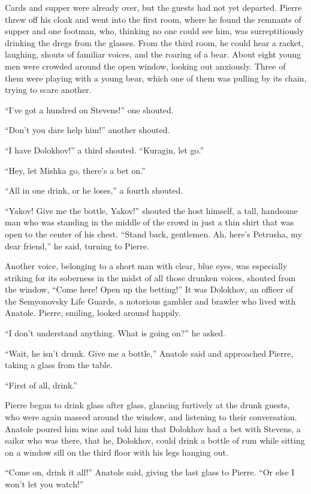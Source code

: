 Cards and supper were already over, but the guests had not yet departed. Pierre threw off his cloak and went into the first room, where he found the remnants of supper and one footman, who, thinking no one could see him, was surreptitiously drinking the dregs from the glasses. From the third room, he could hear a racket, laughing, shouts of familiar voices, and the roaring of a bear. About eight young men were crowded around the open window, looking out anxiously. Three of them were playing with a young bear, which one of them was pulling by its chain, trying to scare another.

``I've got a hundred on Stevens!'' one shouted.

``Don't you dare help him!'' another shouted.

``I have Dolokhov!'' a third shouted. ``Kuragin, let go.''

``Hey, let Mishka go, there's a bet on.''

``All in one drink, or he loses,'' a fourth shouted.

``Yakov! Give me the bottle, Yakov!'' shouted the host himself, a tall, handsome man who was standing in the middle of the crowd in just a thin shirt that was open to the center of his chest. ``Stand back, gentlemen. Ah, here's Petrusha, my dear friend,'' he said, turning to Pierre. %

Another voice, belonging to a short man with clear, blue eyes, was especially striking for its soberness in the midst of all those drunken voices, shouted from the window, ``Come here! Open up the betting!'' It was Dolokhov, an officer of the Semyonovsky Life Guards, a notorious gambler and brawler who lived with Anatole. Pierre, smiling, looked around happily. %

``I don't understand anything. What is going on?'' he asked. %

``Wait, he isn't drunk. Give me a bottle,'' Anatole said and approached Pierre, taking a glass from the table. %

``First of all, drink.'' %

Pierre began to drink glass after glass, glancing furtively at the drunk guests, who were again massed around the window, and listening to their conversation. Anatole poured him wine and told him that Dolokhov had a bet with Stevens, a sailor who was there, that he, Dolokhov, could drink a bottle of rum while sitting on a window sill on the third floor with his legs hanging out.

``Come on, drink it all!'' Anatole said, giving the last glass to Pierre. ``Or else I won't let you watch!'' %

